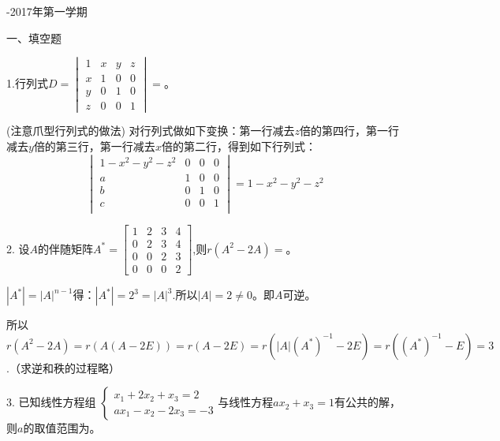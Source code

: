 \documentclass{article}
\begin{document}
\newpage
\hphantom{~~}\hfill {-2017年第一学期} \hfill\hphantom{~~}

一、填空题

1.行列式$
D=
\begin{vmatrix}
  1 & x & y & z\\
  x & 1 & 0 & 0\\
  y & 0 & 1 & 0\\
  z & 0 & 0 & 1
\end{vmatrix}=
$\underline{\hphantom{~~~~~~~~~~}}。

\begin{jie}
(注意爪型行列式的做法)
对行列式做如下变换：第一行减去$z$倍的第四行，第一行减去$y$倍的第三行，第一行减去$x$倍的第二行，得到如下行列式：
\begin{equation*}
  \begin{vmatrix}
  1-x^{2}-y^{2}-z^{2} & 0 & 0 & 0\\
  a & 1 & 0 & 0\\
  b & 0 & 1 & 0\\
  c & 0 & 0 & 1\\
\end{vmatrix}=1-x^{2}-y^{2}-z^{2}
\end{equation*}
\end{jie}

2. 设$A$的伴随矩阵$
A^{*}=
\begin{bmatrix}
  1 & 2 & 3 & 4\\
  0 & 2 & 3 & 4\\
  0 & 0 & 2 & 3\\
  0 & 0 & 0 & 2
\end{bmatrix}
$,则$r(A^{2}-2A)=$\underline{\hphantom{~~~~~~~~~~}}。

\begin{jie}
$|A^*|=|A|^{n-1}$得：$|A^*|=2^3=|A|^{3}$.所以$|A|=2\neq0$。即$A$可逆。

所以$r(A^{2}-2A)=r(A(A-2E))=r(A-2E)=r(|A|(A^*)^{-1}-2E)=r((A^*)^{-1}-E)=3$.（求逆和秩的过程略）
\end{jie}

3. 已知线性方程组
$
\begin{cases}
 x_{1}+2x_{2}+x_{3}=2\\
 ax_{1}-x_{2}-2x_{3}=-3
\end{cases}
$与线性方程$ax_{2}+x_{3}=1$有公共的解，则$a$的取值范围为\underline{\hphantom{~~~~~~~~~~}}。
\end{document}
